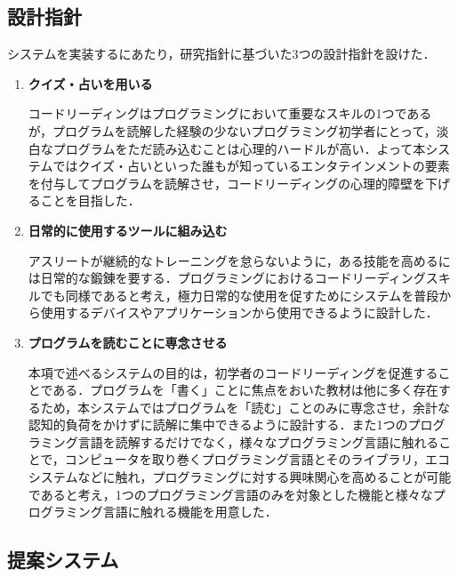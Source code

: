 \subsection{設計指針}
システムを実装するにあたり，研究指針に基づいた3つの設計指針を設けた．
\begin{enumerate}
  \item {\bf クイズ・占いを用いる}

  コードリーディングはプログラミングにおいて重要なスキルの1つであるが，プログラムを読解した経験の少ないプログラミング初学者にとって，淡白なプログラムをただ読み込むことは心理的ハードルが高い．よって本システムではクイズ・占いといった誰もが知っているエンタテインメントの要素を付与してプログラムを読解させ，コードリーディングの心理的障壁を下げることを目指した．


  \item {\bf 日常的に使用するツールに組み込む}

  アスリートが継続的なトレーニングを怠らないように，ある技能を高めるには日常的な鍛錬を要する．プログラミングにおけるコードリーディングスキルでも同様であると考え，極力日常的な使用を促すためにシステムを普段から使用するデバイスやアプリケーションから使用できるように設計した．


  \item {\bf プログラムを読むことに専念させる}

  本項で述べるシステムの目的は，初学者のコードリーディングを促進することである．プログラムを「書く」ことに焦点をおいた教材は他に多く存在するため，本システムではプログラムを「読む」ことのみに専念させ，余計な認知的負荷をかけずに読解に集中できるように設計する．また1つのプログラミング言語を読解するだけでなく，様々なプログラミング言語に触れることで，コンピュータを取り巻くプログラミング言語とそのライブラリ，エコシステムなどに触れ，プログラミングに対する興味関心を高めることが可能であると考え，1つのプログラミング言語のみを対象とした機能と様々なプログラミング言語に触れる機能を用意した．
\end{enumerate}

\subsection{提案システム}

